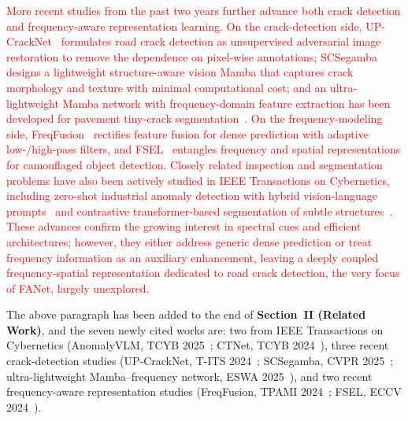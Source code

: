 \documentclass[lettersize,journal,onecolumn,12pt]{IEEEtran}
\begin{document}
\textcolor{red}{
More recent studies from the past two years further advance both crack detection and frequency-aware
representation learning. On the crack-detection side, UP-CrackNet~\cite{TITS24_UPCrackNet} formulates road crack
detection as unsupervised adversarial image restoration to remove the dependence on pixel-wise annotations;
SCSegamba~\cite{CVPR25_SCSegamba} designs a lightweight structure-aware vision Mamba that captures crack morphology
and texture with minimal computational cost; and an ultra-lightweight Mamba network with frequency-domain feature
extraction has been developed for pavement tiny-crack segmentation~\cite{ESWA25_MambaFreqCrack}.
On the frequency-modeling side, FreqFusion~\cite{TPAMI24_FreqFusion} rectifies feature fusion for dense prediction
with adaptive low-/high-pass filters, and FSEL~\cite{ECCV24_FSEL} entangles frequency and spatial representations
for camouflaged object detection. Closely related inspection and segmentation problems have also been actively
studied in IEEE Transactions on Cybernetics, including zero-shot industrial anomaly detection with hybrid
vision-language prompts~\cite{TCYB25_AnomalyVLM} and contrastive transformer-based segmentation of subtle
structures~\cite{TCYB24_CTNet}. These advances confirm the growing interest in spectral cues and efficient
architectures; however, they either address generic dense prediction or treat frequency information as an auxiliary
enhancement, leaving a deeply coupled frequency-spatial representation dedicated to road crack detection, the very
focus of FANet, largely unexplored.
}

The above paragraph has been added to the end of \textbf{Section~II (Related Work)}, and the seven newly cited
works are: two from IEEE Transactions on Cybernetics
(AnomalyVLM, TCYB 2025~\cite{TCYB25_AnomalyVLM}; CTNet, TCYB 2024~\cite{TCYB24_CTNet}),
three recent crack-detection studies
(UP-CrackNet, T-ITS 2024~\cite{TITS24_UPCrackNet}; SCSegamba, CVPR 2025~\cite{CVPR25_SCSegamba};
ultra-lightweight Mamba--frequency network, ESWA 2025~\cite{ESWA25_MambaFreqCrack}),
and two recent frequency-aware representation studies
(FreqFusion, TPAMI 2024~\cite{TPAMI24_FreqFusion}; FSEL, ECCV 2024~\cite{ECCV24_FSEL}).\\[10pt]

\clearpage
\end{document}
